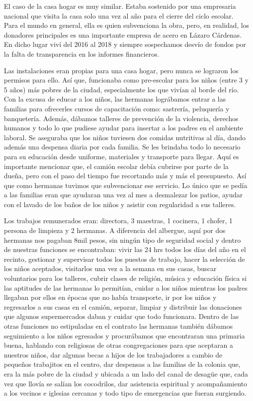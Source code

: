 \documentclass[
  spanish,
  11pt,
  a4paper,
]{scrbook}
\begin{document}
El caso de la casa hogar es muy similar. Estaba sostenido por una
empresaria nacional que visita la casa solo una vez al año para el
cierre del ciclo escolar. Para el mundo en general, ella es quien
subvenciona la obra, pero, en realidad, los donadores principales es una
importante empresa de acero en Lázaro Cárdenas. En dicho lugar viví del
2016 al 2018 y siempre sospechamos desvío de fondos por la falta de
transparencia en los informes financieros.

Las instalaciones eran propias para una casa hogar, pero nunca se
lograron los permisos para ello. Así que, funcionaba como pre-escolar
para los niños (entre 3 y 5 años) más pobres de la ciudad, especialmente
los que vivían al borde del río. Con la excusa de educar a los niños,
las hermanas lográbamos entrar a las familias para ofrecerles cursos de
capacitación como: sastrería, peluquería y banquetería. Además, dábamos
talleres de prevención de la violencia, derechos humanos y todo lo que
pudiese ayudar para insertar a los padres en el ambiente laboral. Se
aseguraba que los niños tuviesen dos comidas nutritivas al día, dando
además una despensa diaria por cada familia. Se les brindaba todo lo
necesario para su educación desde uniforme, materiales y transporte para
llegar. Aquí es importante mencionar que, el camión escolar debía
cubrirse por parte de la dueña, pero con el paso del tiempo fue
recortando más y más el presupuesto. Así que como hermanas tuvimos que
subvencionar ese servicio. Lo único que se pedía a las familias eran que
ayudaran una vez al mes a desmalezar los patios, ayudar con el lavado de
los baños de los niños y asistir con regularidad a sus talleres.

Los trabajos remunerados eran: directora, 3 maestras, 1 cocinera, 1
chofer, 1 persona de limpieza y 2 hermanas. A diferencia del albergue,
aquí por dos hermanas nos pagaban 8mil pesos, sin ningún tipo de
seguridad social y dentro de nuestras funciones se encontraban: vivir
las 24 hrs todos los días del año en el recinto, gestionar y supervisar
todos los puestos de trabajo, hacer la selección de los niños aceptados,
visitarlos una vez a la semana en sus casas, buscar voluntarios para los
talleres, cubrir clases de religión, música y educación física si las
aptitudes de las hermanas lo permitían, cuidar a los niños mientras los
padres llegaban por ellos en épocas que no había transporte, ir por los
niños y regresarlos a sus casas en el camión, separar, limpiar y
distribuir las donaciones que algunos supermercados daban y cuidar que
todo funcionara. Dentro de las otras funciones no estipuladas en el
contrato las hermanas también dábamos seguimiento a los niños egresados
y procurábamos que encontraran una primaria buena, hablando con
religiosas de otras congregaciones para que aceptaran a nuestros niños,
dar algunas becas a hijos de los trabajadores a cambio de pequeños
trabajitos en el centro, dar despensas a las familias de la colonia que,
era la más pobre de la ciudad y ubicada a un lado del canal de desagüe
que, cada vez que llovía se salían los cocodrilos, dar asistencia
espiritual y acompañamiento a los vecinos e iglesias cercanas y todo
tipo de emergencias que fueran surgiendo.
\end{document}
